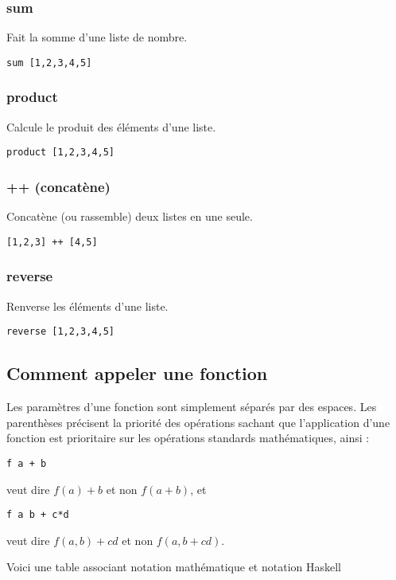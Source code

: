 \documentclass[11pt]{article}
\begin{document}
\subsubsection{sum}
\label{sec:orgcb1b862}
Fait la somme d'une liste de nombre.
\begin{verbatim}
sum [1,2,3,4,5]
\end{verbatim}

\subsubsection{product}
\label{sec:orgd56a01e}
Calcule le produit des éléments d'une liste.
\begin{verbatim}
product [1,2,3,4,5]
\end{verbatim}

\subsubsection{++ (concatène)}
\label{sec:orgd78acad}
Concatène (ou rassemble) deux listes en une seule.
\begin{verbatim}
[1,2,3] ++ [4,5]
\end{verbatim}

\subsubsection{reverse}
\label{sec:orgc44a8bf}
Renverse les éléments d'une liste.
\begin{verbatim}
reverse [1,2,3,4,5]
\end{verbatim}

\subsection{Comment appeler une fonction}
\label{sec:orgb0da816}
Les paramètres d'une fonction sont simplement séparés par des espaces.    Les parenthèses précisent la priorité des opérations sachant que l'application d'une fonction est prioritaire sur les opérations standards mathématiques, ainsi :
\begin{verbatim}
f a + b
\end{verbatim}
veut dire \(f(a) + b\) et non \(f(a+b)\), et 
\begin{verbatim}
f a b + c*d
\end{verbatim}
veut dire \(f(a, b) + cd\) et non \(f(a,b+cd)\). 

Voici une table associant notation mathématique et notation Haskell
\end{document}
